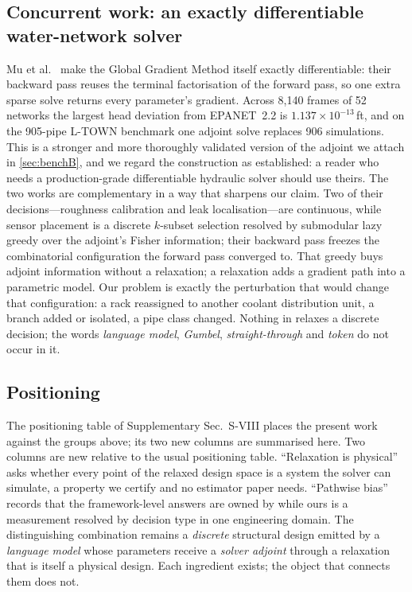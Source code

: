 \subsection{Concurrent work: an exactly differentiable water-network solver}
\label{sec:rw-concurrent}
Mu et al.\ \cite{mu2026gga} make the Global Gradient Method itself exactly
differentiable: their backward pass reuses the terminal factorisation of the
forward pass, so one extra sparse solve returns every parameter's gradient.
Across 8{,}140 frames of 52 networks the largest head deviation from EPANET~2.2
is $1.137\times10^{-13}$\,ft, and on the 905-pipe L-TOWN benchmark one adjoint
solve replaces 906 simulations.  This is a stronger and more thoroughly
validated version of the adjoint we attach in \cref{sec:benchB}, and we regard
the construction as established: a reader who needs a production-grade
differentiable hydraulic solver should use theirs.  The two works are
complementary in a way that sharpens our claim.  Two of their decisions---roughness calibration and leak localisation---are
continuous, while sensor placement is a discrete $k$-subset selection resolved by
submodular lazy greedy over the adjoint's Fisher information; their backward pass
freezes the combinatorial configuration the forward pass converged to.  That greedy
buys adjoint information without a relaxation; a relaxation adds a gradient path
into a parametric model.  Our problem is exactly the perturbation that would change that
configuration: a rack reassigned to another coolant distribution unit, a branch
added or isolated, a pipe class changed.  Nothing in \cite{mu2026gga} relaxes a
discrete decision; the words \emph{language model}, \emph{Gumbel},
\emph{straight-through} and \emph{token} do not occur in it.

\subsection{Positioning}
\label{sec:rw-positioning}
The positioning table of Supplementary Sec.~S-VIII places the present work
against the groups above; its two new columns are summarised here.  Two
columns are new relative to the usual positioning table.  ``Relaxation is
physical'' asks whether every point of the relaxed design space is a system the
solver can simulate, a property we certify and no estimator paper needs.
``Pathwise bias'' records that the framework-level answers are owned by
\cite{suh2022diffsim,onoda2026ddcg,scheffler2026cfobg,hpo2026} while ours is a
measurement resolved by decision type in one engineering domain.  The
distinguishing combination remains a \emph{discrete} structural design emitted
by a \emph{language model} whose parameters receive a \emph{solver adjoint}
through a relaxation that is itself a physical design.  Each ingredient exists;
the object that connects them does not.

